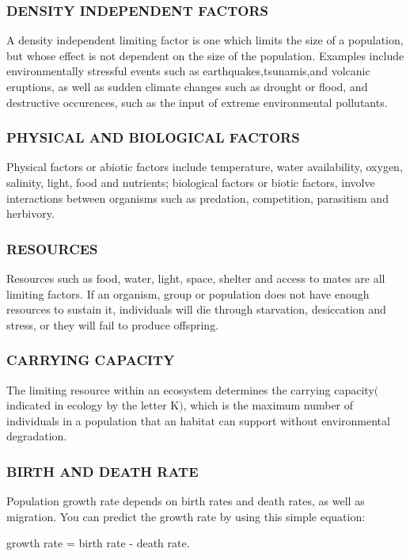 \documentclass[a4paper,12pt]{report}
\numberwithin{equation}{section}
\begin{document}
\subsubsection{DENSITY INDEPENDENT FACTORS}
\indent A density independent limiting factor is one which limits the size of a population, but whose effect is not dependent on the size of the population. Examples include environmentally stressful events such as earthquakes,tsunamis,and volcanic eruptions, as well as sudden climate changes such as drought or flood, and destructive occurences, such as the input of extreme environmental pollutants.

\subsubsection{PHYSICAL AND BIOLOGICAL FACTORS}
\indent Physical factors or abiotic factors include temperature, water availability, oxygen, salinity, light, food and nutrients; biological factors or biotic factors, involve interactions between organisms such as predation, competition, parasitism and herbivory.

\subsubsection{RESOURCES}
Resources such as food, water, light, space, shelter and access to mates are all limiting factors. If an organism, group or population does not have enough resources to sustain it, individuals will die through starvation, desiccation and stress, or they will fail to produce offspring.

\subsubsection{CARRYING CAPACITY}
The limiting resource within an ecosystem determines the carrying capacity$($indicated in ecology by the letter K$)$, which is the maximum number of individuals in a population that an habitat can support without environmental degradation.


\subsubsection{BIRTH AND DEATH RATE}
\indent Population growth rate depends on birth rates and death rates, as well as migration. You can predict the growth rate by using this simple equation:

\begin{center}
growth rate = birth rate - death rate.
\end{center}
 
\end{document}
